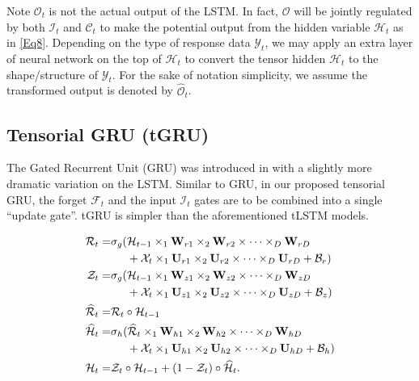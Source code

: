 \documentclass[journal]{IEEEtran}
\newcounter{ToDo}
\newcounter{gaocomm}
\newcounter{Note}
\newcommand\todo[1]{\textcolor{red}{\stepcounter{ToDo}{\bf [Todo \arabic{ToDo}:}\; #1]}} %
\newcommand{\GaoC}[1]{\textcolor{blue-violet}{\stepcounter{gaocomm}{\bf [Junbin's comment \arabic{gaocomm}: #1]}\;}}
\begin{document}
Note $\mathcal{O}_t$ is not the actual output of the LSTM. In fact, $\mathcal{O}$ will be jointly regulated by both $\mathcal{I}_t$ and $\mathcal{C}_t$ to make the potential output from the hidden variable $\mathcal{H}_t$ as in \eqref{Eq8}. Depending on the type of response data $\mathcal{Y}_t$, we may apply an extra layer of neural network on the top of $\mathcal{H}_t$ to convert the tensor hidden $\mathcal{H}_t$ to the shape/structure of $\mathcal{Y}_t$. For the sake of notation simplicity, we assume the transformed output is denoted by $\widehat{\mathcal{O}}_t$. 

\subsection{Tensorial GRU (tGRU)}
The Gated Recurrent Unit (GRU) was introduced in \cite{ChoMerrieenboerGuelccehreBahdanauBougaresSchwenkBengio2014} with a slightly more dramatic variation on the LSTM.  Similar to GRU, in our proposed tensorial GRU, the forget $\mathcal{F}_t$ and the input $\mathcal{I}_t$ gates are to be combined into a single ``update gate''.  tGRU is simpler than the aforementioned tLSTM models.  %

 

\begin{align}
\mathcal{R}_t =& \sigma_g(\mathcal{H}_{t-1}\times_1 \mathbf W_{r1}\times_2 \mathbf W_{r2}\times \cdots \times_D\mathbf{W}_{rD}  \notag\\
&\phantom{\sigma_g(} + \mathcal{X}_{t}\times_1 \mathbf U_{r1}\times_2 \mathbf U_{r2}\times \cdots \times_D\mathbf{U}_{rD} + \mathcal{B}_r) \label{Eq9}\\
\mathcal{Z}_t =& \sigma_g(\mathcal{H}_{t-1}\times_1 \mathbf W_{z1}\times_2 \mathbf W_{z2}\times \cdots \times_D\mathbf{W}_{zD}  \notag\\
&\phantom{\sigma_g(} + \mathcal{X}_{t}\times_1 \mathbf U_{z1}\times_2 \mathbf U_{z2}\times \cdots \times_D\mathbf{U}_{zD} + \mathcal{B}_z) \label{Eq10}\\
\widehat{\mathcal{R}}_t =& \mathcal{R}_t \circ \mathcal{H}_{t-1} \label{Eq11}\\
\widehat{\mathcal{H}}_t =& \sigma_h(\widehat{\mathcal{R}}_{t}\times_1 \mathbf W_{h1}\times_2 \mathbf W_{h2}\times \cdots \times_D\mathbf{W}_{hD}  \notag\\
&\phantom{\sigma_g(} + \mathcal{X}_{t}\times_1 \mathbf U_{h1}\times_2 \mathbf U_{h2}\times \cdots \times_D\mathbf{U}_{hD} + \mathcal{B}_h) \label{Eq12}\\
\mathcal{H}_t =& \mathcal{Z}_t \circ \mathcal{H}_{t-1} + (1 - \mathcal{Z}_t) \circ \widehat{\mathcal{H}}_t. \label{Eq13}
\end{align}
% 
% 
\end{document}
